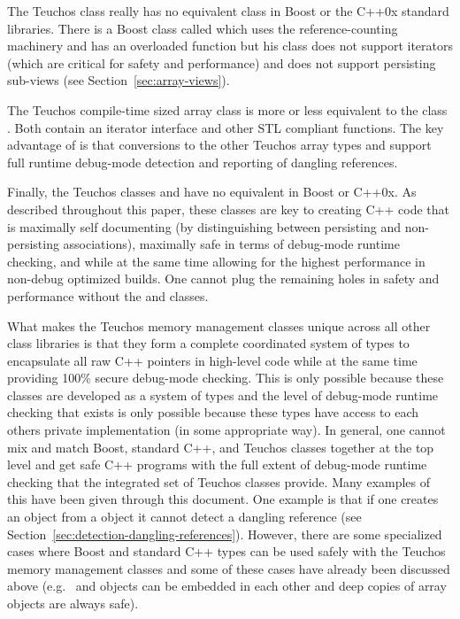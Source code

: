 \documentclass[pdf,ps2pdf,11pt]{SANDreport}
\begin{document}
The Teuchos class {} really has no equivalent class in
Boost or the C++0x standard libraries.  There is a Boost class called
{} which uses the {}
reference-counting machinery and has an overloaded
{} function but his class does not support
iterators (which are critical for safety and performance) and does not
support persisting sub-views (see Section~\ref{sec:array-views}).

The Teuchos compile-time sized array class {} is more or
less equivalent to the class {}.  Both contain an
iterator interface and other STL compliant functions.  The key
advantage of {} is that conversions to the other Teuchos
array types {} and {} support full
runtime debug-mode detection and reporting of dangling references.

Finally, the Teuchos classes {} and {} have no
equivalent in Boost or C++0x.  As described throughout this paper,
these classes are key to creating C++ code that is maximally self
documenting (by distinguishing between persisting and non-persisting
associations), maximally safe in terms of debug-mode runtime checking,
and while at the same time allowing for the highest performance in
non-debug optimized builds.  One cannot plug the remaining holes in
safety and performance without the {} and {}
classes.

What makes the Teuchos memory management classes unique across all
other class libraries is that they form a complete coordinated system
of types to encapsulate all raw C++ pointers in high-level code while
at the same time providing 100\% secure debug-mode checking.  This is
only possible because these classes are developed as a system of types
and the level of debug-mode runtime checking that exists is only
possible because these types have access to each others private
implementation (in some appropriate way).  In general, one cannot mix
and match Boost, standard C++, and Teuchos classes together at the top
level and get safe C++ programs with the full extent of debug-mode
runtime checking that the integrated set of Teuchos classes provide.
Many examples of this have been given through this document.  One
example is that if one creates an {} object from a
{} object it cannot detect a dangling reference (see
Section~\ref{sec:detection-dangling-references}).  However, there are
some specialized cases where Boost and standard C++ types can be used
safely with the Teuchos memory management classes and some of these
cases have already been discussed above (e.g.\ {} and
{} objects can be embedded in each other and
deep copies of array objects are always safe).
\end{document}
